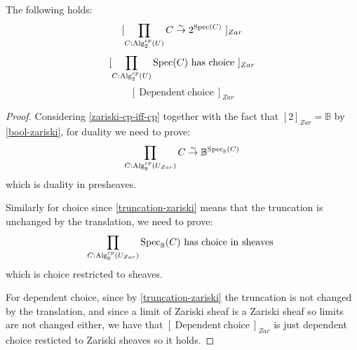 \begin{theorem}\label{zariski-sheaf-axioms}
The following holds:
\[[\prod_{C:\mathrm{Alg}_2^{cp}(U)} C\overset{\sim}{\to} {2}^{\operatorname{Spec}(C)}\ ]_{Zar}\]
\[[\prod_{C:\mathrm{Alg}_2^{cp}(U)} \Spec(C)\ \mathrm{has\ choice}\ ]_{Zar}\]
\[[\ \mathrm{Dependent\ choice}\ ]_{Zar}\]
\end{theorem}

\begin{proof}
Considering \cref{zariski-cp-iff-cp} together with the fact that $[2]_{Zar}=\mathbb{B}$ by \cref{bool-zariski}, for duality we need to prove:
\[\prod_{C:\mathrm{Alg}_\mathbb{B}^{cp}(U_{Zar})} C\overset{\sim}{\to} \mathbb{B}^{\operatorname{Spec}_\mathbb{B}(C)} \]
which is duality in presheaves.

Similarly for choice since \cref{truncation-zariski} means that the truncation is unchanged by the translation, we need to prove:
\[\prod_{C:\mathrm{Alg}_\mathbb{B}^{cp}(U_{Zar})} \operatorname{Spec}_\mathbb{B}(C)\ \mathrm{has\ choice\ in\ sheaves}\  \]
which is choice restricted to sheaves.

For dependent choice, since by \cref{truncation-zariski} the truncation is not changed by the translation, and since a limit of Zariski sheaf is a Zariski sheaf so limits are not changed either, we have that $[\ \mathrm{Dependent\ choice}\ ]_{Zar}$ is just dependent choice resticted to Zariski sheaves so it holds.
\end{proof}


